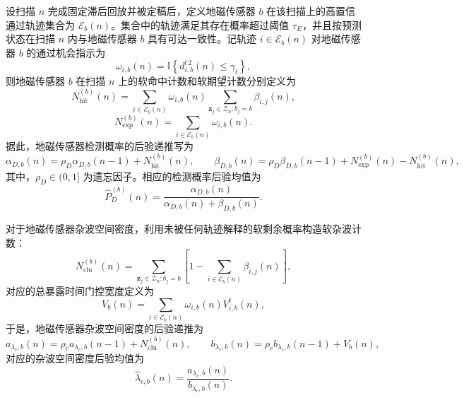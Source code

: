 \documentclass{xdupgthesis}
\begin{document}
设扫描 $n$ 完成固定滞后回放并被定稿后，定义地磁传感器 $b$ 在该扫描上的高置信通过轨迹集合为 $\mathcal E_b(n)$。集合中的轨迹满足其存在概率超过阈值 $\tau_E$，并且按预测状态在扫描 $n$ 内与地磁传感器 $b$ 具有可达一致性。记轨迹 $i\in\mathcal E_b(n)$ 对地磁传感器 $b$ 的通过机会指示为
\begin{equation}
	\omega_{i,b}(n)=\mathbb I\left\{d^{t\,2}_{i,b}(n)\le \gamma_t\right\},
	\label{eq:ch3_pass_indicator}
\end{equation}
则地磁传感器 $b$ 在扫描 $n$ 上的软命中计数和软期望计数分别定义为
\begin{equation}
	N_{\mathrm{hit}}^{(b)}(n)
	=
	\sum_{i\in\mathcal E_b(n)}
	\omega_{i,b}(n)
	\sum_{\mathbf z_j\in \mathcal Z_n:b_j=b}
	\beta_{i,j}(n),
	\label{eq:ch3_soft_hit}
\end{equation}
\begin{equation}
	N_{\mathrm{exp}}^{(b)}(n)
	=
	\sum_{i\in\mathcal E_b(n)}
	\omega_{i,b}(n).
	\label{eq:ch3_soft_exp}
\end{equation}
据此，地磁传感器检测概率的后验递推写为
\begin{equation}
	\alpha_{D,b}(n)=\rho_D\alpha_{D,b}(n-1)+N_{\mathrm{hit}}^{(b)}(n),
	\qquad
	\beta_{D,b}(n)=\rho_D\beta_{D,b}(n-1)+N_{\mathrm{exp}}^{(b)}(n)-N_{\mathrm{hit}}^{(b)}(n),
	\label{eq:ch3_beta_update}
\end{equation}
其中，$\rho_D\in(0,1]$ 为遗忘因子。相应的检测概率后验均值为
\begin{equation}
	\hat P_D^{(b)}(n)=\frac{\alpha_{D,b}(n)}{\alpha_{D,b}(n)+\beta_{D,b}(n)}.
	\label{eq:ch3_pD_mean}
\end{equation}

对于地磁传感器杂波空间密度，利用未被任何轨迹解释的软剩余概率构造软杂波计数：
\begin{equation}
	N_{\mathrm{clu}}^{(b)}(n)
	=
	\sum_{\mathbf z_j\in \mathcal Z_n:b_j=b}
	\left[1-\sum_{i\in\mathcal E_b(n)}\beta_{i,j}(n)\right],
	\label{eq:ch3_soft_clutter}
\end{equation}
对应的总暴露时间门控宽度定义为
\begin{equation}
	V_b(n)=
	\sum_{i\in\mathcal E_b(n)}
	\omega_{i,b}(n)V^{t}_{i,b}(n),
	\label{eq:ch3_exposure_volume}
\end{equation}
于是，地磁传感器杂波空间密度的后验递推为
\begin{equation}
	a_{\lambda_c,b}(n)=\rho_c a_{\lambda_c,b}(n-1)+N_{\mathrm{clu}}^{(b)}(n),
	\qquad
	b_{\lambda_c,b}(n)=\rho_c b_{\lambda_c,b}(n-1)+V_b(n),
	\label{eq:ch3_kappa_update}
\end{equation}
对应的杂波空间密度后验均值为
\begin{equation}
	\hat\lambda_{c,b}(n)=\frac{a_{\lambda_c,b}(n)}{b_{\lambda_c,b}(n)}.
	\label{eq:ch3_kappa_mean_v2}
\end{equation}
\end{document}
